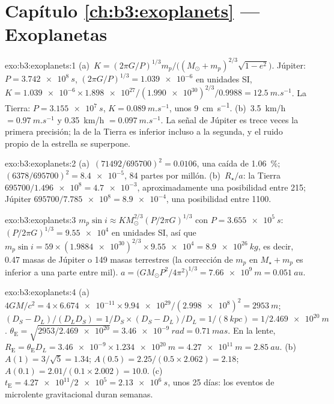 \section*{Capítulo \ref{ch:b3:exoplanets} --- Exoplanetas}

\begin{solution}{exo:b3:exoplanets:1}
(a)~$K = (2\pi G/P)^{1/3}m_p/\bigl((M_\odot + m_p)^{2/3}\sqrt{1 - e^2}\bigr)$.
Júpiter: $P = \qty{3.742e8}{s}$, $(2\pi G/P)^{1/3} = \num{1.039e-6}$ en
unidades SI, $K = \num{1.039e-6}\times\num{1.898e27}/(\num{1.990e30})^{2/3}/0.9988
= \qty{12.5}{m.s^{-1}}$. La Tierra: $P = \qty{3.155e7}{s}$, $K =
\qty{0.089}{m.s^{-1}}$, unos \qty{9}{cm.s^{-1}}. (b)~\qty{3.5}{km/h} $=
\qty{0.97}{m.s^{-1}}$ y \qty{0.35}{km/h} $= \qty{0.097}{m.s^{-1}}$.
La señal de Júpiter es trece veces la primera precisión; la de la Tierra es
inferior incluso a la segunda, y el ruido propio de la estrella se superpone.
\end{solution}

\begin{solution}{exo:b3:exoplanets:2}
(a)~$(71492/695700)^2 = \num{0.0106}$, una caída de \qty{1.06}{\percent};
$(6378/695700)^2 = \num{8.4e-5}$, 84 partes por millón. (b)~$R_\star/a$:
la Tierra $695700/\num{1.496e8} = \num{4.7e-3}$, aproximadamente una posibilidad entre 215;
Júpiter $695700/\num{7.785e8} = \num{8.9e-4}$, una posibilidad entre 1100.
\end{solution}

\begin{solution}{exo:b3:exoplanets:3}
$m_p\sin i \approx K M_\odot^{2/3}(P/2\pi G)^{1/3}$ con $P =
\qty{3.655e5}{s}$: $(P/2\pi G)^{1/3} = \num{9.55e4}$ en unidades SI, así que $m_p
\sin i = 59\times(\num{1.9884e30})^{2/3}\times\num{9.55e4} =
\qty{8.9e26}{kg}$, es decir, 0.47 masas de Júpiter o 149 masas terrestres (la
corrección de $m_p$ en $M_\star + m_p$ es inferior a una parte entre mil).
$a = \bigl(GM_\odot P^2/4\pi^2\bigr)^{1/3} = \qty{7.66e9}{m} =
\qty{0.051}{au}$.
\end{solution}

\begin{solution}{exo:b3:exoplanets:4}
(a)~$4GM/c^2 = 4\times\num{6.674e-11}\times\num{9.94e29}/(\num{2.998e8})^2 =
\qty{2953}{m}$; $(D_S - D_L)/(D_LD_S) = 1/D_S\times(D_S - D_L)/D_L =
1/(\qty{8}{kpc}) = 1/\qty{2.469e20}{m}$. $\theta_\mathrm E =
\sqrt{2953/\num{2.469e20}} = \qty{3.46e-9}{rad} = \qty{0.71}{mas}$. En la
lente, $R_\mathrm E = \theta_\mathrm E D_L = \num{3.46e-9}\times
\qty{1.234e20}{m} = \qty{4.27e11}{m} = \qty{2.85}{au}$. (b)~$A(1) =
3/\sqrt5 = 1.34$; $A(0.5) = 2.25/(0.5\times2.062) = 2.18$; $A(0.1) =
2.01/(0.1\times2.002) = 10.0$. (c)~$t_\mathrm E = \num{4.27e11}/\num{2e5}
= \qty{2.13e6}{s}$, unos 25 días: los eventos de microlente gravitacional duran semanas.
\end{solution}

